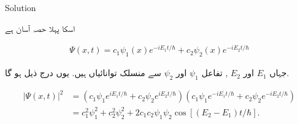 Solution 

اسکا پہلا حصہ آسان ہے 

\begin{align*}
\Psi (x,t) = c_{1} \psi_{1}(x)e^{-iE_{1}t/\hbar} + c_{2} \psi_{2}(x)e^{-iE_{2}t/\hbar}
\end{align*}

جہاں \( E_{1} \) اور \( E_{2} \) , تفاعل \( \psi_{1} \) اور \( \psi_{2} \) سے منسلک توانائیاں ہیں. یوں درج ذیل ہو گا. 

\begin{align*}
\left| \Psi (x,t) \right|^{2} &= \left( c_{1} \psi_{1} e^{iE_{1}t/\hbar} + c_{2} \psi_{2} e^{iE_{2}t/\hbar} \right) \left( c_{1} \psi_{1} e^{-iE_{1}t/\hbar} + c_{2} \psi_{2} e^{-iE_{2}t/\hbar} \right) \\
&= c_{1}^{2} \psi_{1}^{2} + c_{2}^{2} \psi_{2}^{2} + 2c_{1}c_{2}\psi_{1}\psi_{2} \cos [ ( E_{2} - E_{1})t/\hbar].
\end{align*}

